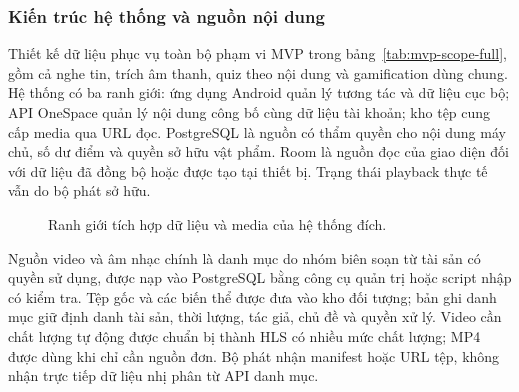 \subsubsection{Kiến trúc hệ thống và nguồn nội dung}
\label{sec:data-sync}

Thiết kế dữ liệu phục vụ toàn bộ phạm vi MVP trong bảng~\ref{tab:mvp-scope-full}, gồm cả nghe tin, trích âm thanh, quiz theo nội dung và gamification dùng chung. Hệ thống có ba ranh giới: ứng dụng Android quản lý tương tác và dữ liệu cục bộ; API OneSpace quản lý nội dung công bố cùng dữ liệu tài khoản; kho tệp cung cấp media qua URL đọc. PostgreSQL là nguồn có thẩm quyền cho nội dung máy chủ, số dư điểm và quyền sở hữu vật phẩm. Room là nguồn đọc của giao diện đối với dữ liệu đã đồng bộ hoặc được tạo tại thiết bị. Trạng thái playback thực tế vẫn do bộ phát sở hữu.

\begin{figure}[htbp]
\centering
{}
\caption{Ranh giới tích hợp dữ liệu và media của hệ thống đích.}
\label{fig:data-system}
\end{figure}

Nguồn video và âm nhạc chính là danh mục do nhóm biên soạn từ tài sản có quyền sử dụng, được nạp vào PostgreSQL bằng công cụ quản trị hoặc script nhập có kiểm tra. Tệp gốc và các biến thể được đưa vào kho đối tượng; bản ghi danh mục giữ định danh tài sản, thời lượng, tác giả, chủ đề và quyền xử lý. Video cần chất lượng tự động được chuẩn bị thành HLS có nhiều mức chất lượng; MP4 được dùng khi chỉ cần nguồn đơn. Bộ phát nhận manifest hoặc URL tệp, không nhận trực tiếp dữ liệu nhị phân từ API danh mục.

